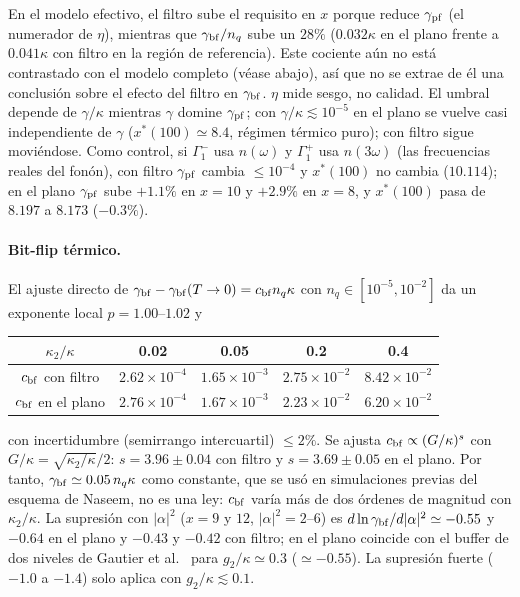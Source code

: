 \documentclass[11pt,a4paper]{article}
\theoremstyle{definition}
\begin{document}
En el modelo efectivo, el filtro sube el requisito en $x$ porque reduce $\gamma_{\rm pf}$ (el numerador de $\eta$), mientras que $\gamma_{\rm bf}/n_q$ sube un $28\%$ ($0.032\kappa$ en el plano frente a $0.041\kappa$ con filtro en la región de referencia). Este cociente aún no está contrastado con el modelo completo (véase abajo), así que no se extrae de él una conclusión sobre el efecto del filtro en $\gamma_{\rm bf}$. $\eta$ mide sesgo, no calidad. El umbral depende de $\gamma/\kappa$ mientras $\gamma$ domine $\gamma_{\rm pf}$; con $\gamma/\kappa\lesssim10^{-5}$ en el plano se vuelve casi independiente de $\gamma$ ($x^{*}(100)\simeq8.4$, régimen térmico puro); con filtro sigue moviéndose. Como control, si $\Gamma_1^{-}$ usa $n(\omega)$ y $\Gamma_1^{+}$ usa $n(3\omega)$ (las frecuencias reales del fonón), con filtro $\gamma_{\rm pf}$ cambia $\leq10^{-4}$ y $x^{*}(100)$ no cambia ($10.114$); en el plano $\gamma_{\rm pf}$ sube $+1.1\%$ en $x=10$ y $+2.9\%$ en $x=8$, y $x^{*}(100)$ pasa de $8.197$ a $8.173$ ($-0.3\%$).

\paragraph{Bit-flip térmico.} El ajuste directo de $\gamma_{\rm bf}-\gamma_{\rm bf}(T\to0)=c_{\rm bf}n_q\kappa$ con $n_q\in[10^{-5},10^{-2}]$ da un exponente local $p=1.00$--$1.02$ y
\begin{center}
\begin{tabular}{ccccc}
\toprule
$\kappa_2/\kappa$ & 0.02 & 0.05 & 0.2 & 0.4\\
\midrule
$c_{\rm bf}$ con filtro & $2.62\times10^{-4}$ & $1.65\times10^{-3}$ & $2.75\times10^{-2}$ & $8.42\times10^{-2}$\\
$c_{\rm bf}$ en el plano & $2.76\times10^{-4}$ & $1.67\times10^{-3}$ & $2.23\times10^{-2}$ & $6.20\times10^{-2}$\\
\bottomrule
\end{tabular}
\end{center}
con incertidumbre (semirrango intercuartil) $\leq2\%$. Se ajusta $c_{\rm bf}\propto(G/\kappa)^s$ con $G/\kappa=\sqrt{\kappa_2/\kappa}/2$: $s=3.96\pm0.04$ con filtro y $s=3.69\pm0.05$ en el plano. Por tanto, $\gamma_{\rm bf}\simeq0.05\,n_q\kappa$ como constante, que se usó en simulaciones previas del esquema de Naseem, no es una ley: $c_{\rm bf}$ varía más de dos órdenes de magnitud con $\kappa_2/\kappa$. La supresión con $|\alpha|^2$ ($x=9$ y $12$, $|\alpha|^2=2$--$6$) es $d\ln\gamma_{\rm bf}/d|\alpha|^2\simeq-0.55$ y $-0.64$ en el plano y $-0.43$ y $-0.42$ con filtro; en el plano coincide con el buffer de dos niveles de Gautier et al.~\cite{Gautier2022} para $g_2/\kappa\simeq0.3$ ($\simeq-0.55$). La supresión fuerte ($-1.0$ a $-1.4$) solo aplica con $g_2/\kappa\lesssim0.1$.
\end{document}
